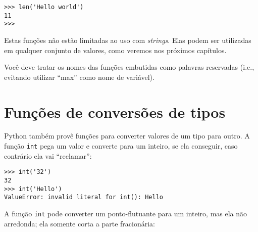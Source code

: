 \beforeverb
\begin{verbatim}
>>> len('Hello world')
11
>>>
\end{verbatim}
\afterverb
%
%
Estas funções não estão limitadas ao uso com {\it strings}. Elas podem ser
utilizadas em qualquer conjunto de valores, como veremos nos próximos capítulos.


Você deve tratar os nomes das funções embutidas como palavras reservadas (i.e.,
evitando utilizar ``max'' como nome de variável).

\section{Funções de conversões de tipos}




Python também provê funções para converter valores de um tipo para outro. A
função {\tt int} pega um valor e converte para um inteiro, se ela conseguir,
caso contrário ela vai ``reclamar'':


\beforeverb
\begin{verbatim}
>>> int('32')
32
>>> int('Hello')
ValueError: invalid literal for int(): Hello
\end{verbatim}
\afterverb
%
%
A função {\tt int} pode converter um ponto-flutuante para um inteiro, mas ela
não arredonda; ela somente corta a parte fracionária:

